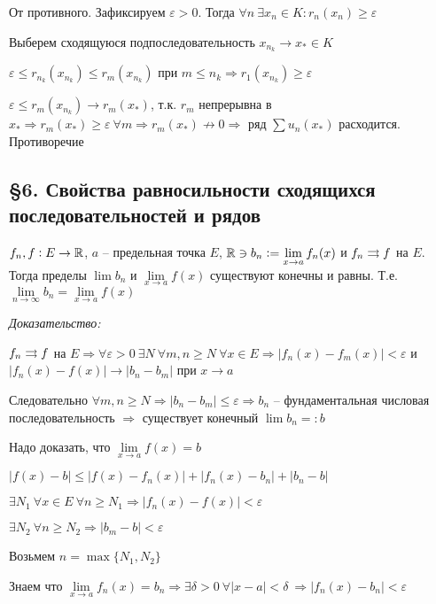 \documentclass[12pt]{article}
\begin{document}
От противного. Зафиксируем $\varepsilon > 0$. Тогда $\forall n\ \exists x_n \in K : r_n(x_n) \geq \varepsilon$

Выберем сходящуюся подпоследовательность $x_{n_k} \to x_* \in K$

$\varepsilon \leq r_{n_k}(x_{n_k}) \leq r_{m}(x_{n_k})$ при $m \leq n_k \Rightarrow r_1(x_{n_k}) \geq \varepsilon$

$\varepsilon \leq r_m(x_{n_k}) \to r_m(x_*)$, т.к. $r_m$ непрерывна в $x_* \Rightarrow r_m(x_*) \geq \varepsilon\ \forall m \Rightarrow r_m(x_*) \not\to 0 \Rightarrow$ ряд $\sum u_n(x_*)$ расходится. Противоречие 

\subsection{\S 6. Свойства равносильности сходящихся последовательностей и рядов}

\begin{theo}{}
    $f_n, f : E \to \mathbb R$, $a$ -- предельная точка $E$, $\mathbb R \ni b_n := \lim\limits_{x \to a} f_n(x)$ и $f_n \rightrightarrows f$ на $E$. Тогда пределы $\lim b_n$ и $\lim\limits_{x \to a} f(x)$ существуют конечны и равны. Т.е. $\lim\limits_{n \to \infty} b_n = \lim\limits_{x \to a} f(x)$
\end{theo}

\textit{Доказательство:}

$f_n \rightrightarrows f$ на $E \Rightarrow \forall \varepsilon > 0\ \exists N\ \forall m, n \geq N\ \forall x \in E \Rightarrow |f_n(x) - f_m(x)| < \varepsilon$ и $|f_n(x) - f(x)| \to |b_n - b_m|$ при $x \to a$

Следовательно $\forall m, n \geq N \Rightarrow |b_n - b_m| \leq \varepsilon \Rightarrow b_n$ -- фундаментальная числовая последовательность $\Rightarrow$ существует конечный $\lim b_n =: b$

Надо доказать, что $\lim\limits_{x \to a} f(x) = b$

$|f(x) - b| \leq |f(x) - f_n(x)| + |f_n(x) - b_n| + |b_n - b|$

$\exists N_1\ \forall x \in E\ \forall n \geq N_1 \Rightarrow |f_n(x) - f(x)| < \varepsilon$

$\exists N_2\ \forall n \geq N_2 \Rightarrow |b_m - b| < \varepsilon$

Возьмем $n = \max\{N_1, N_2\}$

Знаем что $\lim\limits_{x \to a} f_n(x) = b_n \Rightarrow \exists \delta > 0\ \forall |x - a| < \delta\ \Rightarrow |f_n(x) - b_n| < \varepsilon$
\end{document}

